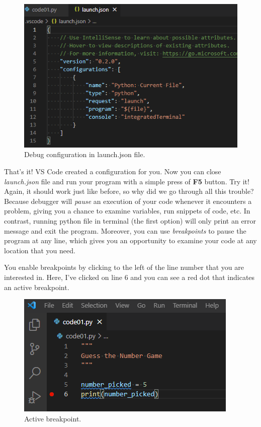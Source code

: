 \documentclass[
]{book}
\begin{document}
\begin{figure}
\centering
\includegraphics{images/debug-launch-json.png}
\caption{Debug configuration in launch.json file.}
\end{figure}

That's it! VS Code created a configuration for you. Now you can close \emph{launch.json} file and run your program with a simple press of \textbf{F5} button. Try it! Again, it should work just like before, so why did we go through all this trouble? Because debugger will \emph{pause} an execution of your code whenever it encounters a problem, giving you a chance to examine variables, run snippets of code, etc. In contrast, running python file in terminal (the first option) will only print an error message and exit the program. Moreover, you can use \emph{breakpoints} to pause the program at any line, which gives you an opportunity to examine your code at any location that you need.

You enable breakpoints by clicking to the left of the line number that you are interested in. Here, I've clicked on line 6 and you can see a red dot that indicates an active breakpoint.

\begin{figure}
\centering
\includegraphics{images/debug-breakpoint.png}
\caption{Active breakpoint.}
\end{figure}
\end{document}
